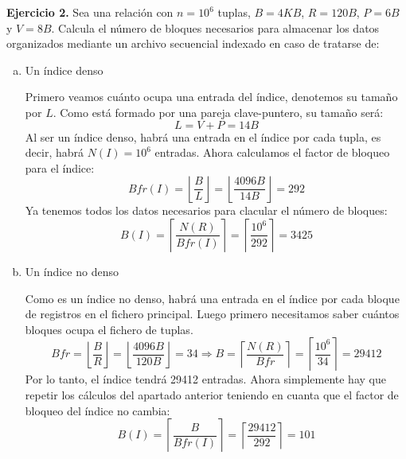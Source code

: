 \documentclass[12pt]{report}
\newcommand{\floor}[1]{\left\lfloor #1 \right\rfloor}
\newcommand{\ceil}[1]{\left\lceil #1 \right\rceil}
\begin{document}
\textbf{Ejercicio 2.} Sea una relación con $n=10^6$ tuplas, $B=4KB$, $R=120B$, $P=6B$ y $V=8B$. Calcula el número de bloques necesarios para almacenar los datos organizados mediante un archivo secuencial indexado en caso de tratarse de:
\begin{enumerate}[(a)]
\item Un índice denso

Primero veamos cuánto ocupa una entrada del índice, denotemos su tamaño por $L$. Como está formado por una pareja clave-puntero, su tamaño será:
\[
L=V+P=14B
\]
Al ser un índice denso, habrá una entrada en el índice por cada tupla, es decir, habrá $N(I)=10^6$ entradas. Ahora calculamos el factor de bloqueo para el índice:
\[
Bfr(I)=\floor{\frac{B}{L}}=\floor{\frac{4096B}{14B}}=292
\]
Ya tenemos todos los datos necesarios para clacular el número de bloques:
\[
B(I)=\ceil{\frac{N(R)}{Bfr(I)}}=\ceil{\frac{10^6}{292}}=3425
\]
\item Un índice no denso

Como es un índice no denso, habrá una entrada en el índice por cada bloque de registros en el fichero principal. Luego primero necesitamos saber cuántos bloques ocupa el fichero de tuplas.
\[
Bfr=\floor{\frac{B}{R}}=\floor{\frac{4096B}{120B}}=34 \Rightarrow 
B=\ceil{\frac{N(R)}{Bfr}}=\ceil{\frac{10^6}{34}}=29412
\]
Por lo tanto, el índice tendrá 29412 entradas. Ahora simplemente hay que repetir los cálculos del apartado anterior teniendo en cuanta que el factor de bloqueo del índice no cambia:
\[
B(I)=\ceil{\frac{B}{Bfr(I)}}=\ceil{\frac{29412}{292}}=101
\]
\end{enumerate}
\end{document}

